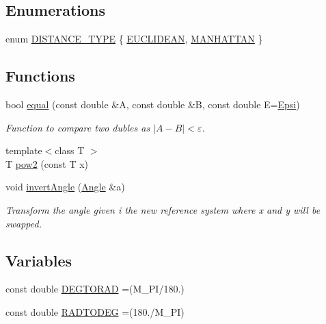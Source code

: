 \subsection*{Enumerations}
\begin{DoxyCompactItemize}
\item 
enum \mbox{\hyperlink{maths_8hh_ac50d7263b1cae8691420b86282b27f90}{D\+I\+S\+T\+A\+N\+C\+E\+\_\+\+T\+Y\+PE}} \{ \mbox{\hyperlink{maths_8hh_ac50d7263b1cae8691420b86282b27f90a81bbbc4428c3ff3f1327e94957e2b5f1}{E\+U\+C\+L\+I\+D\+E\+AN}}, 
\mbox{\hyperlink{maths_8hh_ac50d7263b1cae8691420b86282b27f90a9ae95b5995796e7e5f32fa482a5bff98}{M\+A\+N\+H\+A\+T\+T\+AN}}
 \}
\end{DoxyCompactItemize}
\subsection*{Functions}
\begin{DoxyCompactItemize}
\item 
bool \mbox{\hyperlink{maths_8hh_a24e66125d5c9aea6608f537bdf77841e}{equal}} (const double \&A, const double \&B, const double E=\mbox{\hyperlink{maths_8hh_a78802b279ab85021d7f6bffe51621703}{Epsi}})
\begin{DoxyCompactList}\small\item\em Function to compare two dubles as $\vert A-B\vert < \varepsilon$. \end{DoxyCompactList}\item 
{\footnotesize template$<$class T $>$ }\\T \mbox{\hyperlink{maths_8hh_a054f7427a96b10baa550060a0376584c}{pow2}} (const T x)
\item 
void \mbox{\hyperlink{maths_8hh_a3af8b8654f1cdb8e8e4b8f72dcc5edd5}{invert\+Angle}} (\mbox{\hyperlink{class_angle}{Angle}} \&a)
\begin{DoxyCompactList}\small\item\em Transform the angle given i the new reference system where x and y will be swapped. \end{DoxyCompactList}\end{DoxyCompactItemize}
\subsection*{Variables}
\begin{DoxyCompactItemize}
\item 
const double \mbox{\hyperlink{maths_8hh_abe8c019db43eb490b67df53e48a69d28}{D\+E\+G\+T\+O\+R\+AD}} =(M\+\_\+\+PI/180.)
\item 
const double \mbox{\hyperlink{maths_8hh_abbe9061bc2ecde6e056b25705a50a829}{R\+A\+D\+T\+O\+D\+EG}} =(180./M\+\_\+\+PI)
\end{DoxyCompactItemize}



